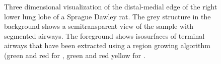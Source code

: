 \begin{figure}
{%
		}%
	\caption{Three dimensional visualization of the distal-medial edge of the right lower lung lobe of a Sprague Dawley rat. The grey structure in the background shows a semitransparent view of the sample with segmented airways. The foreground shows isosurfaces of terminal airways that have been extracted using a region growing algorithm (green and red for , green and red yellow for .}
	\label{fig:overview}
\end{figure}

